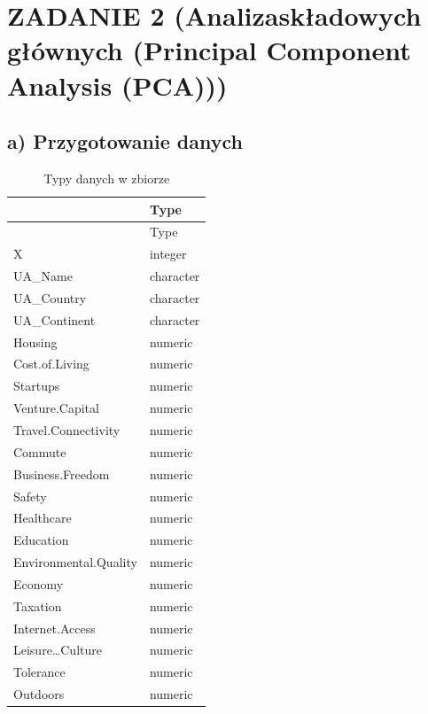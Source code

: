 \documentclass[
  12pt,
]{article}
\begin{document}
\section{ZADANIE 2 (Analizaskładowych głównych (Principal Component
Analysis
(PCA)))}\label{zadanie-2-analizaskux142adowych-gux142uxf3wnych-principal-component-analysis-pca}

\subsection{a) Przygotowanie danych}\label{a-przygotowanie-danych}

\begin{longtable}[]{@{}ll@{}}
\caption{Typy danych w zbiorze}\tabularnewline
\toprule\noalign{}
& Type \\
\midrule\noalign{}
\endfirsthead
\toprule\noalign{}
& Type \\
\midrule\noalign{}
\endhead
\bottomrule\noalign{}
\endlastfoot
X & integer \\
UA\_Name & character \\
UA\_Country & character \\
UA\_Continent & character \\
Housing & numeric \\
Cost.of.Living & numeric \\
Startups & numeric \\
Venture.Capital & numeric \\
Travel.Connectivity & numeric \\
Commute & numeric \\
Business.Freedom & numeric \\
Safety & numeric \\
Healthcare & numeric \\
Education & numeric \\
Environmental.Quality & numeric \\
Economy & numeric \\
Taxation & numeric \\
Internet.Access & numeric \\
Leisure\ldots Culture & numeric \\
Tolerance & numeric \\
Outdoors & numeric \\
\end{longtable}
\end{document}
